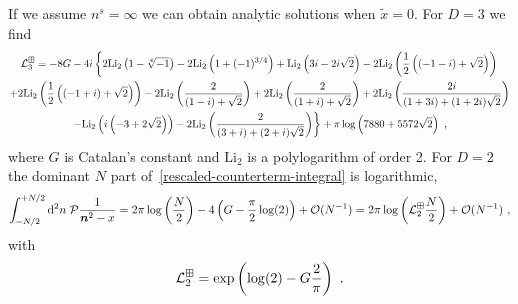If we assume $n^{s}=\infty$ we can obtain analytic solutions when $\tilde x=0$.  For $D=3$ we find
\begin{multline}
\mathcal{L}_3^{\boxplus}=-8 G-4 i \left\{2 \text{Li}_2\left(1-\sqrt[4]{-1}\right)-2 \text{Li}_2\left(1+(-1)^{3/4}\right)+\text{Li}_2\left(3 i-2 i
   \sqrt{2}\right)-2 \text{Li}_2\left(\frac{1}{2} \left((-1-i)+\sqrt{2}\right)\right)\right.\\
   \left.+2 \text{Li}_2\left(\frac{1}{2}
   \left((-1+i)+\sqrt{2}\right)\right)-2 \text{Li}_2\left(\frac{2}{(1-i)+\sqrt{2}}\right)+2
   \text{Li}_2\left(\frac{2}{(1+i)+\sqrt{2}}\right)+2 \text{Li}_2\left(\frac{2 i}{(1+3 i)+(1+2 i)
   \sqrt{2}}\right)\right.\\
   \left.-\text{Li}_2\left(i \left(-3+2 \sqrt{2}\right)\right)-2 \text{Li}_2\left(\frac{2}{(3+i)+(2+i)
   \sqrt{2}}\right)\right\}+\pi  \log \left(7880+5572 \sqrt{2}\right)\ ,
   \end{multline}
where $G$ is Catalan's constant and $\text{Li}_2$ is a polylogarithm of order 2.  For $D=2$ the dominant $N$ part of~\eqref{rescaled-counterterm-integral} is logarithmic,
\begin{equation}
 \int_{-N/2}^{+N/2} \mathrm{d}^2n\; \PV \frac{1}{\bm n^2 - x}= 2\pi\log\left(\frac{N}{2}\right)-4\left(G-\frac{\pi }{2}\log(2)\right)+\mathcal{O}(N^{-1})=2\pi\log\left(\counterterm_2^{\dispersion}\frac{N}{2}\right)+\mathcal{O}(N^{-1})\ ,
\end{equation}
with
\begin{equation}
\counterterm_2^\dispersion=\exp\left(\log(2)-G\frac{2}{\pi}\right)\ .
\end{equation}
